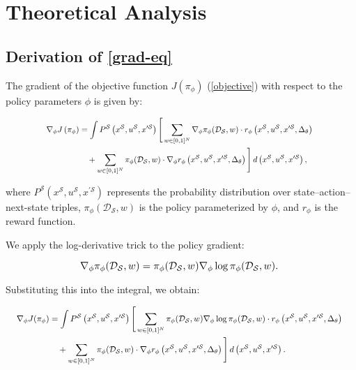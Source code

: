 \section{Theoretical Analysis}
\label{derivation}
\subsection*{Derivation of \autoref{grad-eq}}
The gradient of the objective function \( J\left(\pi_\phi\right) \) (\autoref{objective}) with respect to the policy parameters \( \phi \) is given by:


\begin{equation}
\resizebox{0.8\hsize}{!}{%
$\displaystyle
\begin{aligned}
\nabla_{\phi} J\left(\pi_{\phi}\right) &= \int P^{\mathcal{S}}\left(x^{\mathcal{S}}, u^{\mathcal{S}}, x^{\prime \mathcal{S}}\right) \Bigg[ \sum_{w \in [0,1]^{N}} \nabla_{\phi} \pi_{\phi}(\mathcal{D_S}, w) \cdot r_\phi\left(x^{\mathcal{S}}, u^{\mathcal{S}}, x^{\prime \mathcal{S}}, \Delta_\theta\right) \\
&\quad + \sum_{w \in [0,1]^{N}} \pi_{\phi}(\mathcal{D_S}, w) \cdot \nabla_{\phi} r_\phi\left(x^{\mathcal{S}}, u^{\mathcal{S}}, x^{\prime \mathcal{S}}, \Delta_\theta\right) \Bigg] \, d\left(x^{\mathcal{S}}, u^{\mathcal{S}}, x^{\prime \mathcal{S}}\right),
\end{aligned}$
}
\end{equation}

where \( P^{\mathcal{S}}\left(x^{\mathcal{S}}, u^{\mathcal{S}}, x^{\prime \mathcal{S}}\right) \) represents the probability distribution over state--action--next-state triples, \( \pi_{\phi}(\mathcal{D_S}, w) \) is the policy parameterized by \( \phi \), and \( r_{\phi} \) is the reward function.

We apply the log-derivative trick to the policy gradient:

\begin{equation}
\resizebox{0.6\hsize}{!}{%
$\displaystyle
\nabla_{\phi} \pi_{\phi}(\mathcal{D_S}, w) = \pi_{\phi}(\mathcal{D_S}, w) \nabla_{\phi} \log \pi_{\phi}(\mathcal{D_S}, w).
$
}
\end{equation}

Substituting this into the integral, we obtain:

\begin{equation}
\resizebox{0.98\hsize}{!}{%
$\displaystyle
\begin{aligned}
\nabla_{\phi} J(\pi_{\phi}) &= \int P^{\mathcal{S}}\left(x^{\mathcal{S}}, u^{\mathcal{S}}, x^{\prime \mathcal{S}}\right) \Bigg[ \sum_{w \in [0,1]^{N}} \pi_{\phi}(\mathcal{D_S}, w) \nabla_{\phi} \log \pi_{\phi}(\mathcal{D_S}, w) \cdot r_\phi\left(x^{\mathcal{S}}, u^{\mathcal{S}}, x^{\prime \mathcal{S}}, \Delta_\theta\right) \\
&\quad + \sum_{w \in [0,1]^{N}} \pi_{\phi}(\mathcal{D_S}, w) \cdot \nabla_{\phi} r_\phi\left(x^{\mathcal{S}}, u^{\mathcal{S}}, x^{\prime \mathcal{S}}, \Delta_\theta\right) \Bigg] \, d\left(x^{\mathcal{S}}, u^{\mathcal{S}}, x^{\prime \mathcal{S}}\right).
\end{aligned}$
}
\end{equation}


